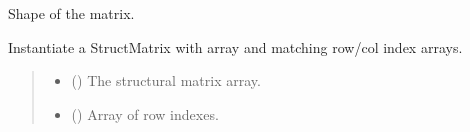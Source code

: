 \documentclass[letterpaper,12pt,english]{sphinxmanual}
\begin{document}
\begin{fulllineitems}
\begin{fulllineitems}
\begin{quote}
\begin{description}
\end{description}\end{quote}

\end{fulllineitems}


\begin{fulllineitems}
\label{\detokenize{api/core:cbmpy.CBCommon.StructMatrix.shape}}
\pysigstartsignatures
\pysigline
{}
\pysigstopsignatures
\sphinxAtStartPar
Shape of the matrix.
\begin{quote}\begin{description}
\sphinxAtStartPar
{}

\end{description}\end{quote}

\end{fulllineitems}


\begin{fulllineitems}
\label{\detokenize{api/core:cbmpy.CBCommon.StructMatrix.__init__}}
\pysigstartsignatures
\pysiglinewithargsret
{}
{\sphinxparamcomma {}\sphinxparamcomma {}\sphinxparamcomma {}\sphinxparamcomma {}}
{}
\pysigstopsignatures
\sphinxAtStartPar
Instantiate a StructMatrix with array and matching row/col index arrays.
\begin{quote}\begin{description}
\begin{itemize}
\item {} 
\sphinxAtStartPar
{} () \textendash{} The structural matrix array.

\item {} 
\sphinxAtStartPar
{} () \textendash{} Array of row indexes.


\end{itemize}
\end{description}
\end{quote}
\end{fulllineitems}
\end{fulllineitems}
\end{document}
